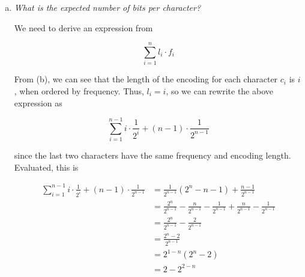 \documentclass{article}
\begin{document}
\begin{enumerate}[(a)]
  \item \textit{What is the expected number of bits per character?}

    We need to derive an expression from

    $$\sum_{i=1}^n l_i \cdot f_i$$

    From (b), we can see that the length of the encoding for each character $c_i$ is $i$, when ordered by frequency. Thus, $l_i = i$, so we can rewrite the above expression as

    $$\sum_{i=1}^{n-1} i\cdot\frac{1}{2^i} + (n-1)\cdot\frac{1}{2^{n-1}}$$

    since the last two characters have the same frequency and encoding length. Evaluated, this is

    \begin{align*}
      \sum_{i=1}^{n-1} i\cdot\frac{1}{2^i} + (n-1)\cdot\frac{1}{2^{n-1}} &= \frac{1}{2^{n-1}}(2^n-n-1) + \frac{n-1}{2^{n-1}}\\
      &= \frac{2^n}{2^{n-1}} - \frac{n}{2^{n-1}} - \frac{1}{2^{n-1}} + \frac{n}{2^{n-1}} - \frac{1}{2^{n-1}} \\
      &= \frac{2^n}{2^{n-1}} - \frac{2}{2^{n-1}} \\
      &= \frac{2^n -2}{2^{n-1}} \\
      &= 2^{1-n}(2^n - 2) \\
      &= 2 - 2^{2-n}
    \end{align*}


\end{enumerate}
\end{document}
